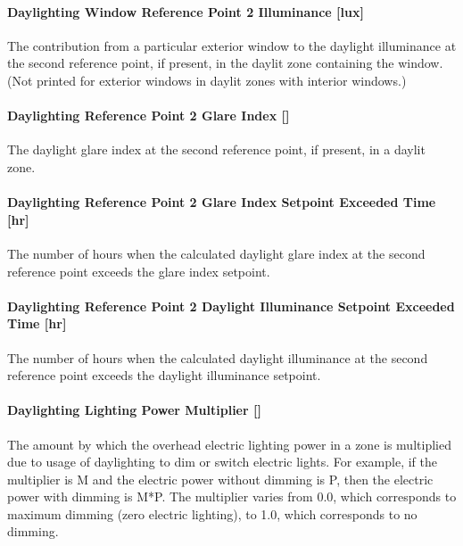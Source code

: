 \paragraph{Daylighting Window Reference Point 2 Illuminance {[}lux{]}}\label{daylighting-window-reference-point-2-illuminance-lux}

The contribution from a particular exterior window to the daylight illuminance at the second reference point, if present, in the daylit zone containing the window. (Not printed for exterior windows in daylit zones with interior windows.)

\paragraph{Daylighting Reference Point 2 Glare Index {[]}}\label{daylighting-reference-point-2-glare-index}

The daylight glare index at the second reference point, if present, in a daylit zone.

\paragraph{Daylighting Reference Point 2 Glare Index Setpoint Exceeded Time {[}hr{]}}\label{daylighting-reference-point-2-glare-index-setpoint-exceeded-time-hr}

The number of hours when the calculated daylight glare index at the second reference point exceeds the glare index setpoint.

\paragraph{Daylighting Reference Point 2 Daylight Illuminance Setpoint Exceeded Time {[}hr{]}}\label{daylighting-reference-point-2-daylight-illuminance-setpoint-exceeded-time-hr}

The number of hours when the calculated daylight illuminance at the second reference point exceeds the daylight illuminance setpoint.

\paragraph{Daylighting Lighting Power Multiplier {[]}}\label{daylighting-lighting-power-multiplier-1}

The amount by which the overhead electric lighting power in a zone is multiplied due to usage of daylighting to dim or switch electric lights. For example, if the multiplier is M and the electric power without dimming is P, then the electric power with dimming is M*P. The multiplier varies from 0.0, which corresponds to maximum dimming (zero electric lighting), to 1.0, which corresponds to no dimming.

